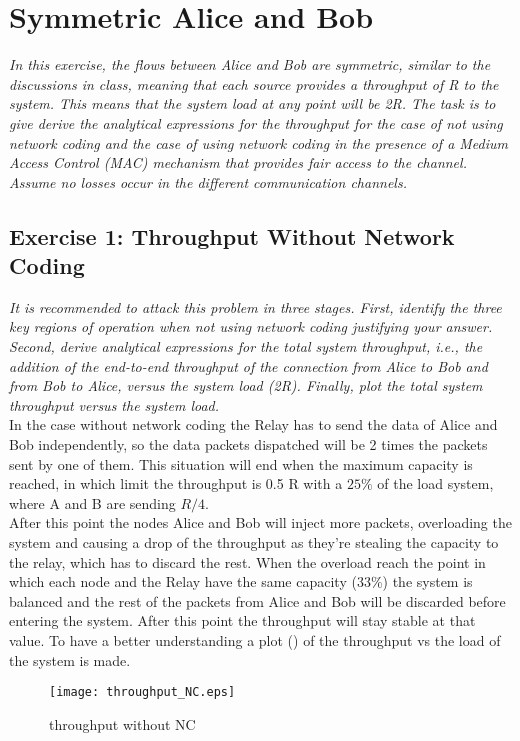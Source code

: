 \section{Symmetric Alice and Bob}
\textit{In this exercise, the flows between Alice and Bob are symmetric, similar to the discussions in class, meaning that each source provides a throughput of R to the system. This means that the system load at any point will be 2R. The task is to give derive the analytical expressions for the throughput for the case of not using network coding and the case of using network coding in the presence of a Medium Access Control (MAC) mechanism that provides fair access to the channel. Assume no losses occur in the different communication channels.}

\subsection{Exercise 1: Throughput Without Network Coding}
\textit{It is recommended to attack this problem in three stages. First, identify the three key regions of operation when not using network coding justifying your answer. Second, derive analytical expressions for the total system throughput, i.e., the addition of the end-to-end throughput of the connection from Alice to Bob and from Bob to Alice, versus the system load (2R). Finally, plot the total system throughput versus the system load.}\\

In the case without network coding the Relay has to send the data of Alice and Bob independently, so the data packets dispatched will be 2 times the packets sent by one of them.  This situation will end when the maximum capacity is reached, in which limit the throughput is 0.5 R with a $25\%$ of the load system, where A and B are sending $R/4$. \\
After this point the nodes Alice and Bob will inject more packets, overloading the system and causing a drop of the throughput as they're stealing the capacity to the relay, which has to discard the rest. When the overload reach the point in which each node and the Relay have the same capacity ($33\%$) the system is balanced and the rest of the packets from Alice and Bob will be discarded before entering the system. After this point the throughput will stay stable at that value. To have a better understanding a plot () of the throughput vs the load of the system is made.
\begin{figure}[!h]
  \centering
  \texttt{[image: throughput\_NC.eps]}
  \caption{throughput without NC}
  \label{fig:throughput_NC}
\end{figure}
\newpage
